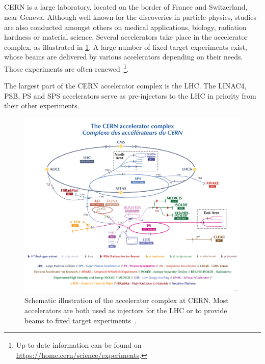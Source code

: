 \subsection{}

CERN is a large laboratory, located on the border of France and Switzerland, near Geneva. Although
well known for the discoveries in particle physics, studies are also conducted amongst others on
medical applications, biology, radiation hardness or material science.
Several accelerators take place in the accelerator complex, as illustrated in
\cref{fig:introduction:cern_complex}. A large number of fixed target experiments exist, whose
beams are delivered by various accelerators depending on their needs. Those experiments are often
renewed~\footnote{Up to date information can be found on
\href{https://home.cern/science/experiments}{https://home.cern/science/experiments}.}.

The largest part of the CERN accelerator complex is the LHC. The LINAC4, PSB, PS and SPS
accelerators serve as pre-injectors to the LHC in priority from their other experiments.

\begin{figure}[!htb]
    \centering
    \includegraphics[width=1\textwidth]{images/cern_complex.png}
    \caption{Schematic illustration of the accelerator complex at CERN. Most accelerators are both
    used as injectors for the LHC or to provide beams to fixed target
    experiments~\cite{noauthor_cern_2022}.}
    \label{fig:introduction:cern_complex}
\end{figure}


